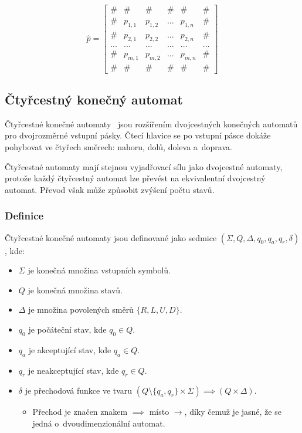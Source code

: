 \[
    \hat{p} = \begin{bmatrix}
        \#  & \#      & \#      & \#  & \#      & \# \\
        \#  & p_{1,1} & p_{1,2} & ... & p_{1,n} & \# \\
        \#  & p_{2,1} & p_{2,2} & ... & p_{2,n} & \# \\
        ... & ...     & ...     & ... & ...     & ...\\
        \#  & p_{m,1} & p_{m,2} & ... & p_{m,n} & \# \\
        \#  & \#      & \#      & \#  & \#      & \#
    \end{bmatrix}
\]

\subsection{Čtyřcestný konečný automat}
\label{chap:4fa}

Čtyřcestné konečné automaty~\cite{RozenbergGrzegorz1997HoFL} jsou rozšířením
dvojcestných konečných automatů pro dvojrozměrné vstupní pásky. Čtecí hlavice
se po vstupní pásce dokáže pohybovat ve čtyřech směrech: nahoru, dolů, doleva
a~doprava.

Čtyřcestné automaty mají stejnou vyjadřovací sílu jako dvojcestné automaty,
protože každý čtyřcestný automat lze převést na ekvivalentní dvojcestný
automat. Převod však může způsobit zvýšení počtu stavů.

\subsubsection{Definice}

Čtyřcestné konečné automaty jsou definované jako sedmice
\((\Sigma, Q, \Delta, q_0, q_a, q_r, \delta)\), kde:

\begin{itemize}
    \item \(\Sigma\) je konečná množina vstupních symbolů.
    \item \(Q\) je konečná množina stavů.
    \item \(\Delta\) je množina povolených směrů \(\{R, L, U, D\}\).
    \item \(q_0\) je počáteční stav, kde \(q_0 \in Q\).
    \item \(q_a\) je akceptující stav, kde \(q_a \in Q\).
    \item \(q_r\) je neakceptující stav, kde \(q_r \in Q\).
    \item \(\delta\) je přechodová funkce ve tvaru
        \((Q \setminus \{q_a, q_r\} \times \Sigma) \implies (Q \times \Delta)\).
    \begin{itemize}
        \item Přechod je značen znakem \(\implies\) místo \(\rightarrow\), díky
            čemuž je jasné, že se jedná o~dvoudimenzionální automat.
    \end{itemize}
\end{itemize}

